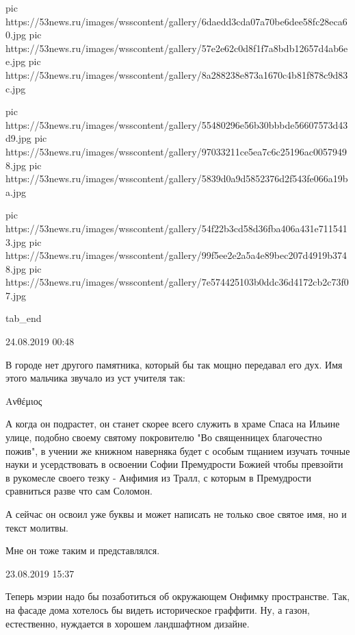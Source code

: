 pic https://53news.ru/images/wsscontent/gallery/6daedd3cda07a70be6dee58fc28eca60.jpg
pic https://53news.ru/images/wsscontent/gallery/57e2e62c0d8f1f7a8bdb12657d4ab6ee.jpg
pic https://53news.ru/images/wsscontent/gallery/8a288238e873a1670c4b81f878c9d83c.jpg

pic https://53news.ru/images/wsscontent/gallery/55480296e56b30bbbde56607573d43d9.jpg
pic https://53news.ru/images/wsscontent/gallery/97033211ce5ea7c6c25196ac00579498.jpg
pic https://53news.ru/images/wsscontent/gallery/5839d0a9d5852376d2f543fe066a19ba.jpg

pic https://53news.ru/images/wsscontent/gallery/54f22b3cd58d36fba406a431e7115413.jpg
pic https://53news.ru/images/wsscontent/gallery/99f5ee2e2a5a4e89bec207d4919b3748.jpg
pic https://53news.ru/images/wsscontent/gallery/7e574425103b0ddc36d4172cb2c73f07.jpg

tab_end
\fi


\begin{itemize}
24.08.2019
00:48

В городе нет другого памятника, который бы так мощно передавал его дух.
Имя этого мальчика звучало из уст учителя так:

Ανθέμιος

А когда он подрастет, он станет скорее всего служить в храме Спаса на Ильине
улице, подобно своему святому покровителю "Во священницех благочестно пожив", в
учении же книжном наверняка будет с особым тщанием изучать точные науки и
усердствовать в освоении Софии Премудрости Божией чтобы превзойти в рукомесле
своего тезку - Анфимия из Тралл, с которым в Премудрости сравниться разве что
сам Соломон.

А сейчас он освоил уже буквы и может написать не только свое святое имя, но и
текст молитвы.

Мне он тоже таким и представлялся.

23.08.2019
15:37

Теперь мэрии надо бы позаботиться об окружающем Онфимку пространстве. Так, на
фасаде дома хотелось бы видеть историческое граффити. Ну, а
газон, естественно, нуждается в хорошем ландшафтном дизайне.

\end{itemize}
